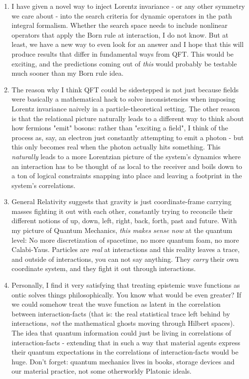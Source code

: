 \documentclass{article}
\begin{document}
\begin{enumerate}

\item I have given a novel way to inject Lorentz invariance - or any other symmetry we care about - into the search criteria for dynamic operators in the path integral formalism. Whether the search space needs to include nonlinear operators that apply the Born rule at interaction, I do not know. But at least, we have a new way to even look for an answer and I hope that this will produce results that differ in fundamental ways from QFT. This would be exciting, and the predictions coming out of \textit{this} would probably be testable much sooner than my Born rule idea.

\item The reason why I think QFT could be sidestepped is not just because fields were basically a mathematical hack to solve inconsistencies when imposing Lorentz invariance naively in a particle-theoretical setting. The other reason is that the relational picture naturally leads to a different way to think about how fermions "emit" bosons: rather than "exciting a field", I think of the process as, say, an electron just constantly attempting to emit a photon - but this only becomes real when the photon actually hits something. This \textit{naturally} leads to a more Lorentzian picture of the system's dynamics where an interaction has to be thought of as local to the receiver and boils down to a ton of logical constraints snapping into place and leaving a footprint in the system's correlations.

\item General Relativity suggests that gravity is just coordinate-frame carrying masses fighting it out with each other, constantly trying to reconcile their different notions of up, down, left, right, back, forth, past and future. With my picture of Quantum Mechanics, \textit{this makes sense now} at the quantum level: No more discretization of spacetime, no more quantum foam, no more Calabi-Yaus. Particles are \textit{real} at interactions and this reality leaves a trace, and outside of interactions, you can not say anything. They \textit{carry} their own coordinate system, and they fight it out through interactions.

\item Personally, I find it very satisfying that treating epistemic wave functions as ontic solves things philosophically. You know what would be even greater? If we could somehow treat the wave function as latent in the correlation between interaction-facts (that is: the real statistical trace left behind by interactions, \textit{not} the mathematical ghosts moving through Hilbert spaces). The idea that quantum information could just be living in correlations of interaction-facts - extending that in such a way that material agents express their quantum expectations in the correlations of interaction-facts would be huge. Don't forget: quantum mechanics lives in books, storage devices and our material practice, not some otherworldy Platonic ideals.


\end{enumerate}
\end{document}
